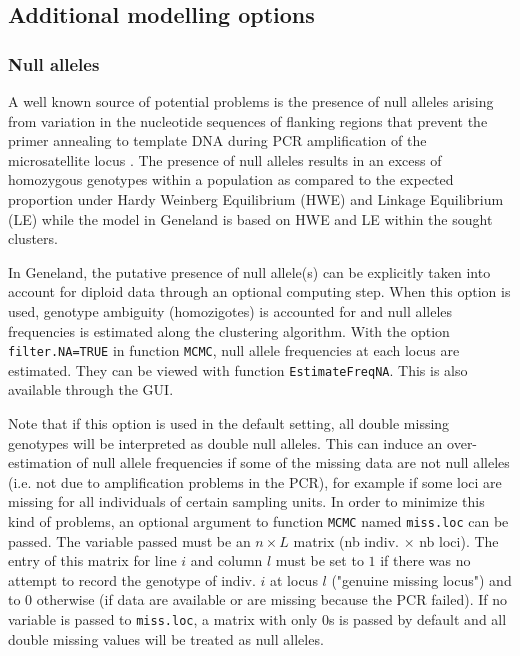 \documentclass[a4paper,10pt]{article}
\begin{document}
\subsection{Additional modelling options}

\subsubsection{Null alleles}\label{sec:null_alleles}

A well known source of potential problems is the
presence of null alleles arising from variation in the 
nucleotide sequences of flanking regions that prevent the primer annealing to template DNA during PCR amplification of 
the microsatellite locus \citep{Dakin04,Pompanon05}. 
The presence of null alleles results in an excess of homozygous genotypes within a population as compared to 
the expected proportion under Hardy Weinberg Equilibrium (HWE) and Linkage Equilibrium (LE)  \citep{Callen93,Paetkau95} while 
the model in {\sc Geneland} is based on HWE and LE within the sought clusters. 

In {\sc Geneland}, the putative presence of null allele(s) can be  explicitly taken into account for diploid data through an optional computing step. 
When this option is used, genotype ambiguity (homozigotes) is accounted for and null alleles frequencies is estimated 
along the clustering algorithm. 
With the option \texttt{filter.NA=TRUE} in function \texttt{MCMC}, 
null allele frequencies at each locus are estimated. 
They can be viewed with function \texttt{EstimateFreqNA}. 
This is also available through the GUI. 

Note that if this option is used in the default setting, 
all double missing genotypes will be interpreted as double
    null alleles. 
This can induce an over-estimation of null allele frequencies 
if some of the missing data are not null alleles 
(i.e. not due to amplification problems in the PCR), for example if some loci 
are missing for all individuals of certain sampling units. 
In order to minimize this kind of problems, an optional argument to function \texttt{MCMC} named \texttt{miss.loc} can be passed. 
The variable passed must be an $n \times L$  matrix (nb indiv. $\times$ nb loci). The entry of this matrix for line $i$ and column $l$ 
must be set to $1$ if there was no attempt to record the genotype of indiv. $i$ at locus $l$ ("genuine missing locus") 
and to $0$ otherwise (if data are available or are missing because  the PCR failed).
If no variable is passed to \texttt{miss.loc}, a matrix with only $0$s is passed by default and all double missing values 
will be treated as null alleles. 
\end{document}

